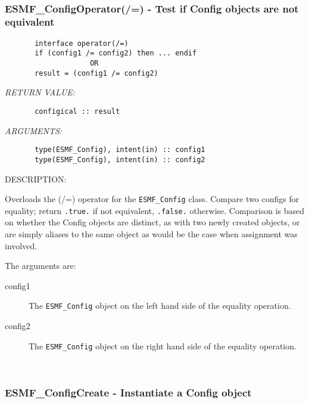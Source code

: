  
\mbox{}\hrulefill\ 
 
\subsubsection [ESMF\_ConfigOperator(/=)] {ESMF\_ConfigOperator(/=) - Test if Config objects are not equivalent}


  
\begin{verbatim}       interface operator(/=)
       if (config1 /= config2) then ... endif
                    OR
       result = (config1 /= config2)\end{verbatim}{\em RETURN VALUE:}
\begin{verbatim}       configical :: result\end{verbatim}{\em ARGUMENTS:}
\begin{verbatim}       type(ESMF_Config), intent(in) :: config1
       type(ESMF_Config), intent(in) :: config2\end{verbatim}
{\sf DESCRIPTION:\\ }


       Overloads the (/=) operator for the {\tt ESMF\_Config} class.
       Compare two configs for equality; return {\tt .true.} if not equivalent,
       {\tt .false.} otherwise. Comparison is based on whether the Config objects
       are distinct, as with two newly created objects, or are simply aliases
       to the same object as would be the case when assignment was involved.
  
       The arguments are:
       \begin{description}
       \item[config1]
            The {\tt ESMF\_Config} object on the left hand side of the equality
            operation.
       \item[config2]
            The {\tt ESMF\_Config} object on the right hand side of the equality
            operation.
       \end{description}
   
 
\mbox{}\hrulefill\ 
 

  \subsubsection [ESMF\_ConfigCreate] {ESMF\_ConfigCreate - Instantiate a Config object}


